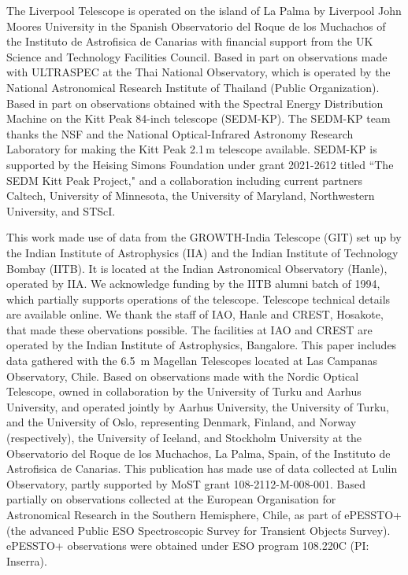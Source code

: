 \documentclass{nature_plusfigure}
\begin{document}
\begin{addendum}
The Liverpool Telescope is operated on the island of La Palma by Liverpool John Moores University in the Spanish Observatorio del Roque de los Muchachos of the Instituto de Astrofisica de Canarias with financial support from the UK Science and Technology Facilities Council.
%
Based in part on observations made with ULTRASPEC at the Thai National Observatory, which is operated by the National Astronomical Research Institute of Thailand (Public Organization).
%
Based in part on observations obtained with the Spectral Energy Distribution
Machine on the Kitt Peak 84-inch telescope (SEDM-KP). The SEDM-KP team
thanks the NSF and the National
Optical-Infrared Astronomy Research Laboratory for making the Kitt
Peak 2.1\,m telescope available. SEDM-KP is supported by the Heising
Simons Foundation under grant 2021-2612 titled ``The SEDM Kitt
Peak Project,"
and a collaboration including current partners Caltech, University of
Minnesota, the
University of Maryland, Northwestern University, and STScI.

This work made use of data from the GROWTH-India Telescope (GIT) set up by the Indian Institute of Astrophysics (IIA) and the Indian Institute of Technology Bombay (IITB). It is located at the Indian Astronomical Observatory (Hanle), operated by IIA. We acknowledge funding by the IITB alumni batch of 1994, which partially supports operations of the telescope. Telescope technical details are available online.\cite{growth_india}
%
We thank the staff of IAO, Hanle and CREST, Hosakote, that made these obervations possible. The facilities at IAO and CREST are operated by the Indian Institute of Astrophysics, Bangalore.
%
This paper includes data gathered with the 6.5~m Magellan Telescopes located at Las Campanas Observatory, Chile.
%
Based on observations made with the Nordic Optical Telescope, owned in collaboration by the University of Turku and Aarhus University, and operated jointly by Aarhus University, the University of Turku, and the University of Oslo, representing Denmark, Finland, and Norway (respectively), the University of Iceland, and Stockholm University at the Observatorio del Roque de los Muchachos, La Palma, Spain, of the Instituto de Astrofisica de Canarias.
%
This publication has made use of data collected at Lulin Observatory, partly supported by MoST grant 108-2112-M-008-001.
%
Based partially on observations collected at the European Organisation for Astronomical Research in the Southern Hemisphere, Chile, as part of ePESSTO+ (the advanced Public ESO Spectroscopic Survey for Transient Objects Survey).
ePESSTO+ observations were obtained under ESO program 108.220C (PI: Inserra).


\end{addendum}
\end{document}
